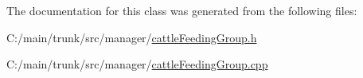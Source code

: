 The documentation for this class was generated from the following files:\begin{DoxyCompactItemize}
\item 
C:/main/trunk/src/manager/\hyperlink{cattle_feeding_group_8h}{cattleFeedingGroup.h}\item 
C:/main/trunk/src/manager/\hyperlink{cattle_feeding_group_8cpp}{cattleFeedingGroup.cpp}\end{DoxyCompactItemize}
